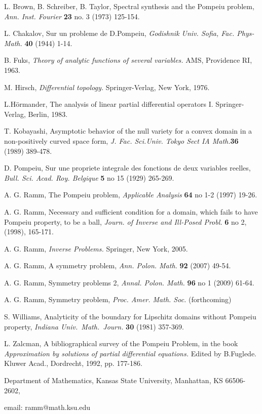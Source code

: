 \documentclass[12pt,leqno]{article}
\begin{document}
\begin{thebibliography}{99}

\baselineskip=16pt
 L. Brown, B. Schreiber, B. Taylor,   Spectral
synthesis and the Pompeiu problem, {\it Ann. Inst. Fourier}  {\bf
23} no. 3 (1973) 125-154.

 L. Chakalov, Sur un probleme de D.Pompeiu, {\it Godishnik
Univ. Sofia, Fac. Phys-Math.} {\bf 40} (1944) 1-14.



 B. Fuks, {\it Theory of analytic functions of several
variables.} AMS, Providence RI, 1963.

 M. Hirsch, {\it Differential topology.} Springer-Verlag, New
York, 1976.

 L.H\"ormander, {The analysis of linear partial differential
operators I.} Springer-Verlag, Berlin, 1983.

 T. Kobayashi, Asymptotic behavior of the null variety for a
convex domain in a non-positively curved space form,
{\it J. Fac. Sci.Univ. Tokyo Sect IA Math.}{\bf 36} (1989) 389-478.

  D. Pompeiu,   Sur une propriete
integrale des fonctions de deux variables reelles,  {\it Bull. Sci.
Acad. Roy. Belgique} {\bf 5} no 15 (1929) 265-269.

 A. G. Ramm,  The Pompeiu problem, {\it Applicable
Analysis} {\bf 64} no 1-2 (1997) 19-26.

 A. G. Ramm,
 Necessary and sufficient condition for a domain, which fails to have
Pompeiu property, to be a ball, {\it Journ. of Inverse and Ill-Posed
Probl.} {\bf 6} no 2, (1998), 165-171.

 A. G. Ramm, {\it Inverse Problems.} Springer, New York,
2005.

 A. G. Ramm, A symmetry problem, {\it Ann. Polon. Math.} {\bf
92} (2007) 49-54.

 A. G. Ramm, Symmetry problems 2, {\it Annal. Polon. Math.} {\bf
96} no 1 (2009) 61-64.

 A. G. Ramm, Symmetry problem, {\it Proc. Amer. Math. Soc.}
(forthcoming)

 S. Williams,
Analyticity of the boundary for Lipschitz domains without Pompeiu
property, {\it Indiana Univ.\ Math.\ Journ.} {\bf 30} (1981) 357-369.

 L. Zalcman, A bibliographical
survey of the Pompeiu Problem, in the book {\it Approximation by
solutions of partial differential equations.} Edited by B.Fuglede.
Kluwer Acad., Dordrecht, 1992, pp. 177-186.

\end{thebibliography}








Department of Mathematics, Kansas State University, Manhattan, KS
66506-2602,


email:     ramm@math.ksu.edu
\end{document}
